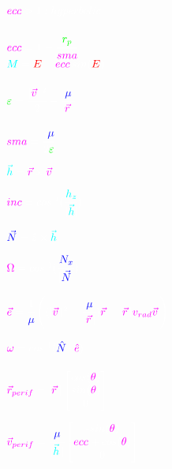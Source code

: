 \documentclass{article}
\newcommand{\dashexp}{\scalebox{0.35}[0.5]{$-$}}
\newcommand{\dash}{\scalebox{0.5}[1.0]{$-$}}
\begin{document}
$\color{mag}ecc\color{white}>1: hyperbolic$\\\\

$
\color{mag}ecc\color{white}=1-\cfrac{\color{green}r_p\color{white}}{\color{mag}sma}
$\\


$
\color{cyan}M\color{white}=\color{red}E\color{white}-\color{mag}ecc
\color{white}\,sin(\color{red}E\color{white})
$\\\\


$
\color{green}\varepsilon\color{white}=
\cfrac{|\color{mag}\vec{v}\color{white}\,|^2}{2}-
\cfrac{\color{blue}\mu\color{white}}{|\color{mag}\vec{r}\color{white}\,|}
$

$
\color{mag}sma\color{white}=
\cfrac{\dash\color{blue}\mu\color{white}}{2\color{green}\varepsilon\color{white}}
$


$
\color{cyan}\vec{h}\color{white}=\color{mag}\vec{r}
\color{white}\times\color{mag}\vec{v}
$

$
\color{mag}inc\color{white}=cos^{\dashexp1}
(\cfrac{\color{cyan}h_z\color{white}}{|\color{cyan}\vec{h}\color{white}|})
$

$
\color{blue}\vec{N}\color{white}=\hat{z}\times
\color{cyan}\vec{h}
$

$
\color{mag}\Omega\color{white}=cos^{\dashexp1}
(\cfrac{\color{blue}N_x\color{white}}{|\color{blue}\vec{N}\color{white}|})
$

$
\color{mag}\vec{e}\color{white}=\cfrac{1}{\color{blue}\mu\color{white}}\left(
(|\color{mag}\vec{v}\color{white}\,|^2-\cfrac{\color{blue}\mu\color{white}}{|\color{mag}\vec{r}\color{white}\,|})
\color{mag}\vec{r}\color{white}-|\color{mag}\vec{r}\color{white}\,|
\color{mag}v_{rad}\vec{v}\color{white}\,\right)
$

$
\color{mag}\omega\color{white}=cos^{\dashexp1}(
\color{blue}\hat{N}\color{white}\cdot\color{mag}\hat{e}\color{white})
$ \\\\

$
\color{mag}\vec{r}_{perif}\color{white}=
|\color{mag}\vec{r}\color{white}\,|
\begin{bmatrix}
	cos(\color{mag}\theta\color{white}) \\
	sin(\color{mag}\theta\color{white}) \\
	0
\end{bmatrix}
$

$
\color{mag}\vec{v}_{perif}\color{white}=
\cfrac{\color{blue}\mu\color{white}}
{|\color{cyan}\vec{h}\color{white}\,|}
\begin{bmatrix}
	\dash sin(\color{mag}\theta\color{white}) \\
	\color{mag}ecc\color{white}+cos(\color{mag}\theta\color{white}) \\
	0
\end{bmatrix}
$
\end{document}
